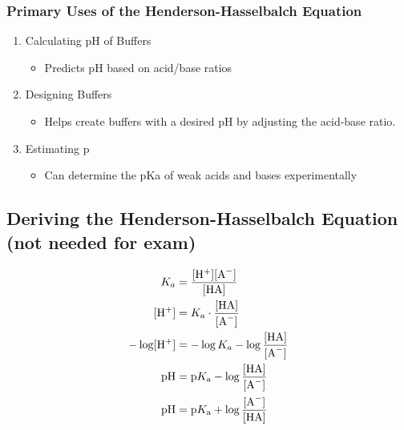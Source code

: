 \documentclass[10pt]{article}
\newcommand{\proton}{\text{H$^+$}}
\newcommand{\ka}{\text{$K_\text{a}$}}
\begin{document}
\subsubsection*{Primary Uses of the Henderson-Hasselbalch Equation}
\begin{enumerate}
    \item Calculating pH of Buffers
    \begin{itemize}
        \item Predicts pH based on acid/base ratios
    \end{itemize}
    \item Designing Buffers
    \begin{itemize}
        \item Helps create buffers with a desired pH by adjusting the acid-base ratio.
    \end{itemize}
    \item Estimating p\ka
    \begin{itemize}
        \item Can determine the pKa of weak acids and bases experimentally
    \end{itemize}
\end{enumerate}
\subsection*{Deriving the Henderson-Hasselbalch Equation (not needed for exam)}
\begin{align*}
    K_a &= \frac{[\proton][\text{A}^-]}{[\text{HA}]}\\
    [\proton] &= K_a \cdot \frac{[\text{HA}]}{[\text{A}^-]}\\
    -\log [\proton] &= -\log K_a -\log \frac{[\text{HA}]}{[\text{A}^-]}\\
    \text{pH} &= \text{p\ka} -\log \frac{[\text{HA}]}{[\text{A}^-]}\\
    \text{pH} &= \text{p\ka} +\log \frac{[\text{A}^-]}{[\text{HA}]}
\end{align*}
\end{document}
